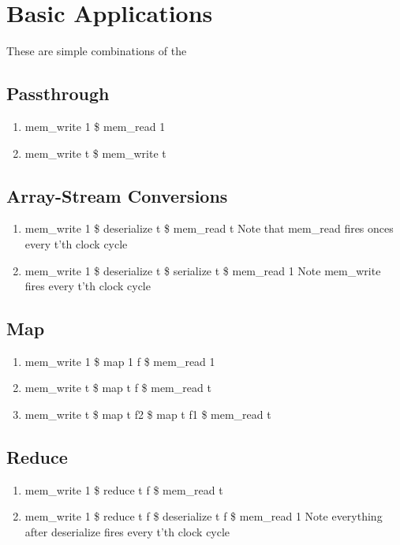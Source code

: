 \documentclass[11pt,fleqn]{article}
\numberwithin{equation}{subsection}
\begin{document}
\section{Basic Applications}
These are simple combinations of the 
\subsection{Passthrough}
\begin{enumerate}
    \item mem\_write 1 \$ mem\_read 1 
    \item mem\_write t \$ mem\_write t
\end{enumerate}

\subsection{Array-Stream Conversions}
\begin{enumerate}
    \item mem\_write 1 \$ deserialize t \$ mem\_read t
        \subitem Note that mem\_read fires onces every t'th clock cycle
    \item mem\_write 1 \$ deserialize t \$ serialize t \$ mem\_read 1
        \subitem Note mem\_write fires every t'th clock cycle
\end{enumerate}

\subsection{Map}
\begin{enumerate}
    \item mem\_write 1 \$ map 1 f \$ mem\_read 1
    \item mem\_write t \$ map t f \$ mem\_read t
    \item mem\_write t \$ map t f2 \$ map t f1 \$ mem\_read t
\end{enumerate}

\subsection{Reduce}
\begin{enumerate}
    \item mem\_write 1 \$ reduce t f \$ mem\_read t
    \item mem\_write 1 \$ reduce t f \$ deserialize t f \$ mem\_read 1
        \subitem Note everything after deserialize fires every t'th clock cycle
\end{enumerate}
\end{document}
